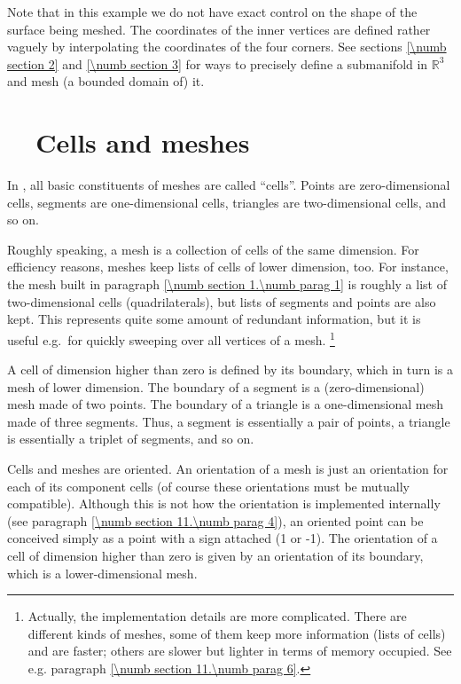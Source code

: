 Note that in this example we do not have exact control on the shape of the surface being meshed.
The coordinates of the inner vertices are defined rather vaguely by interpolating the
coordinates of the four corners.
See sections \ref{\numb section 2} and \ref{\numb section 3} for ways to precisely define
a submanifold in $ \mathbb{R}^3 $ and mesh (a bounded domain of) it.


\section{~~Cells and meshes}\label{\numb section 1.\numb parag 2}

In \maniFEM, all basic constituents of meshes are called ``cells''. 
Points are zero-dimensional cells, segments are one-dimensional cells, triangles are
two-dimensional cells, and so on.

Roughly speaking, a mesh is a collection of cells of the same dimension. 
For efficiency reasons, meshes keep lists of cells of lower dimension, too. 
For instance, the mesh built in paragraph \ref{\numb section 1.\numb parag 1} is 
roughly a list of two-dimensional cells (quadrilaterals), but lists of segments and points
are also kept.
This represents quite some amount of redundant information, but it is useful e.g.\ for
quickly sweeping over all vertices of a mesh.%
\footnote {Actually, the implementation details are more complicated.
There are different kinds of meshes, some of them keep more information (lists of cells)
and are faster; others are slower but lighter in terms of memory occupied.
See e.g. paragraph \ref{\numb section 11.\numb parag 6}.}

A cell of dimension higher than zero is defined by its boundary, 
which in turn is a mesh of lower dimension. 
The boundary of a segment is a (zero-dimensional) mesh made of two points.
The boundary of a triangle is a one-dimensional mesh made of three segments.
Thus, a segment is essentially a pair of points, a triangle is essentially a triplet of segments, and so on.

Cells and meshes are oriented. 
An orientation of a mesh is just an orientation for each of its component cells
(of course these orientations must be mutually compatible).
Although this is not how the orientation is implemented internally
(see paragraph \ref{\numb section 11.\numb parag 4}),
an oriented point can be conceived simply as a point with a sign attached (1 or -1). 
The orientation of a cell of dimension higher than zero is given by an orientation
of its boundary, which is a lower-dimensional mesh.

